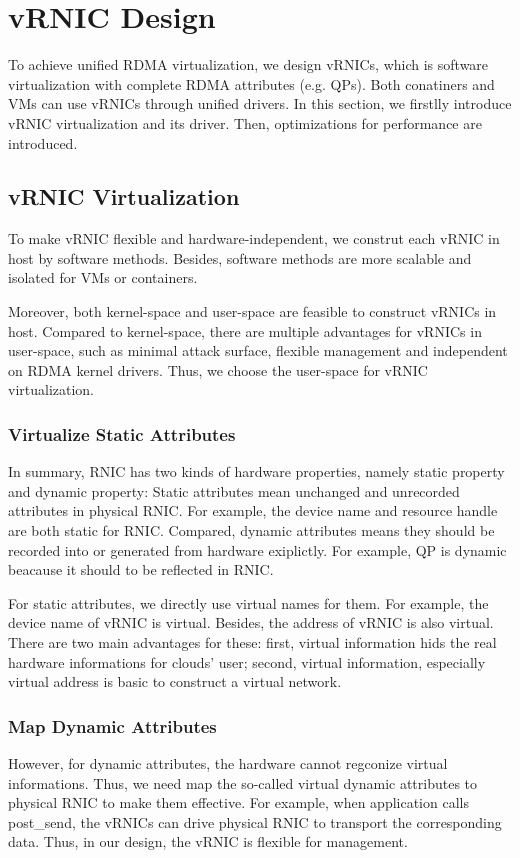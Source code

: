 \section{vRNIC Design}
To achieve unified RDMA virtualization, we design vRNICs, which is software virtualization with complete RDMA attributes (e.g. QPs). Both conatiners and VMs can use vRNICs through unified drivers. In this section, we firstlly introduce vRNIC virtualization and its driver. Then, optimizations for performance are introduced.

\subsection{vRNIC Virtualization}
To make vRNIC flexible and hardware-independent, we construt each vRNIC in host by software methods. Besides, software methods are more scalable and isolated for VMs or containers.

Moreover, both kernel-space and user-space are feasible to construct vRNICs in host. Compared to kernel-space, there are multiple advantages for vRNICs in user-space, such as minimal attack surface, flexible management and independent on RDMA kernel drivers. Thus, we choose the user-space for vRNIC virtualization.

\subsubsection{Virtualize Static Attributes}
In summary, RNIC has two kinds of hardware properties, namely static property and dynamic property: Static attributes mean unchanged and unrecorded attributes in physical RNIC. For example, the device name and resource handle are both static for RNIC. Compared, dynamic attributes means they should be recorded into or generated from hardware exiplictly. For example, QP is dynamic beacause it should to be reflected in RNIC.

For static attributes, we directly use virtual names for them. For example, the device name of vRNIC is virtual. Besides, the address of vRNIC is also virtual. There are two main advantages for these: first, virtual information hids the real hardware informations for clouds' user; second, virtual information, especially virtual address is basic to construct a virtual network. 

\subsubsection{Map Dynamic Attributes}
However, for dynamic attributes, the hardware cannot regconize virtual informations. Thus, we need map the so-called virtual dynamic attributes to physical RNIC to make them effective. For example, when application calls post\_send, the vRNICs can drive physical RNIC to transport the corresponding data. Thus, in our design, the vRNIC is flexible for management. 

